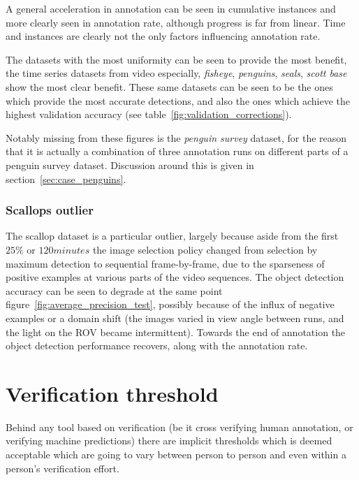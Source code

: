 A general acceleration in annotation can be seen in cumulative instances and more clearly seen in annotation rate, although progress is far from linear. Time and instances are clearly not the only factors influencing annotation rate. 

The datasets with the most uniformity can be seen to provide the most benefit, the time series datasets from video especially, \emph{fisheye}, \emph{penguins}, \emph{seals}, \emph{scott base} show the most clear benefit. These same datasets can be seen to be the ones which provide the most accurate detections, and also the ones which achieve the highest validation accuracy (see table~\ref{fig:validation_corrections}).

Notably missing from these figures is the \emph{penguin survey} dataset, for the reason that it is actually a combination of three annotation runs on different parts of a penguin survey dataset. Discussion around this is given in section~\ref{sec:case_penguins}.


\subsubsection{Scallops outlier}
\label{sec:scallop_outlier}

The scallop dataset is a particular outlier, largely because aside from the first $25\%$ or $120 minutes$ the image selection policy changed from selection by maximum detection to sequential frame-by-frame, due to the sparseness of positive examples at various parts of the video sequences. The object detection accuracy can be seen to degrade at the same point figure~\ref{fig:average_precision_test}, possibly because of the influx of negative examples or a domain shift (the images varied in view angle between runs, and the light on the \gls{ROV} became intermittent). Towards the end of annotation the object detection performance recovers, along with the annotation rate. 



\section{Verification threshold}
\label{sec:verification_threshold}

Behind any tool based on verification (be it cross verifying human annotation, or verifying machine predictions) there are implicit thresholds which is deemed acceptable which are going to vary between person to person and even within a person's verification effort. 

